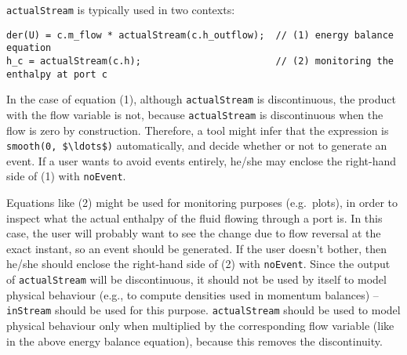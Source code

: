 \begin{nonnormative}
\lstinline!actualStream! is typically used in two contexts:
\begin{lstlisting}[language=modelica]
der(U) = c.m_flow * actualStream(c.h_outflow);  // (1) energy balance equation
h_c = actualStream(c.h);                        // (2) monitoring the enthalpy at port c
\end{lstlisting}
In the case of equation (1), although \lstinline!actualStream!
is discontinuous, the product with the flow variable is not, because
\lstinline!actualStream! is discontinuous when the flow is zero by construction.
Therefore, a tool might infer that the expression is \lstinline!smooth(0, $\ldots$)!
automatically, and decide whether or not to generate an event. If a user
wants to avoid events entirely, he/she may enclose the right-hand side
of (1) with \lstinline!noEvent!.

Equations like (2) might be used for monitoring purposes (e.g.\ plots), in order to inspect what the actual enthalpy of the fluid flowing through a port is.
In this case, the user will probably want to see the change due to flow reversal at the exact instant, so an event should be generated.  If the user doesn't
bother, then he/she should enclose the right-hand side of (2) with \lstinline!noEvent!.  Since the output of \lstinline!actualStream! will be discontinuous,
it should not be used by itself to model physical behaviour (e.g., to compute densities used in momentum balances) -- \lstinline!inStream! should be used
for this purpose.  \lstinline!actualStream! should be used to model physical behaviour only when multiplied by the corresponding flow variable (like in the
above energy balance equation), because this removes the discontinuity.
\end{nonnormative}
